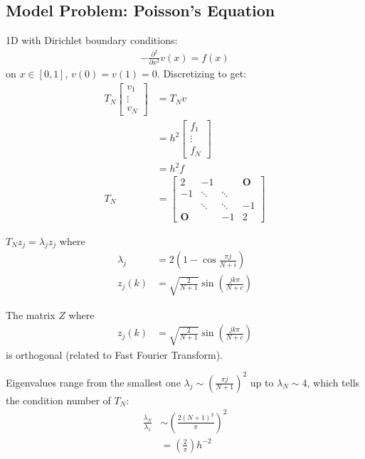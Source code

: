 \documentclass[11pt]{article}
\numberwithin{equation}{section}
\begin{document}
\subsection{Model Problem: Poisson's Equation}
1D with Dirichlet boundary conditions:\begin{align*}
    -\frac{\partial^{2}}{\partial x^{2}} v(x)=f(x)
\end{align*}
on $x \in [0,1]$, $v(0)=v(1)=0$. Discretizing to get:\begin{align*}
    T_N \left[\begin{array}{c}v_{1} \\ \vdots \\ v_{N}\end{array}\right] &= T_N v \\
    &= h^2 \left[\begin{array}{c}f_{1} \\ \vdots \\ f_{N}\end{array}\right] \\
    &= h^2 f \\
    T_N &= \left[\begin{array}{cccc}2 & -1 & & \mathbf{O} \\ -1 & \ddots & \ddots & \\ & \ddots & \ddots & -1 \\ \mathbf{O} & & -1 & 2\end{array}\right]
\end{align*}

\begin{lemma}
    $T_{N} z_{j}=\lambda_{j} z_{j}$ where \begin{align*}
        \lambda_{j}&=2\left(1-\cos \frac{\pi j}{N+i}\right) \\
        z_{j}(k)&=\sqrt{\frac{2}{N+1}} \sin \left( \frac{j k \pi}{N+c} \right)
    \end{align*}
\end{lemma}
\begin{corollary}
    The matrix $Z$ where \begin{align*}
        z_{j}(k)&=\sqrt{\frac{2}{N+1}} \sin \left( \frac{j k \pi}{N+c} \right)
    \end{align*}
    is orthogonal (related to Fast Fourier Transform).
\end{corollary}
Eigenvalues range from the smallest one $\lambda_j \sim \left( \frac{\pi j}{N+1} \right)^2$ up to $\lambda_N \sim 4$, which tells the condition number of $T_N$:\begin{align*}
    \frac{\lambda_N}{\lambda_1} &\sim \left( \frac{2\left( N+1 \right)^2}{\pi} \right)^2 \\
    &=\left( \frac{2}{\pi} \right) h^{-2}
\end{align*}
\end{document}
